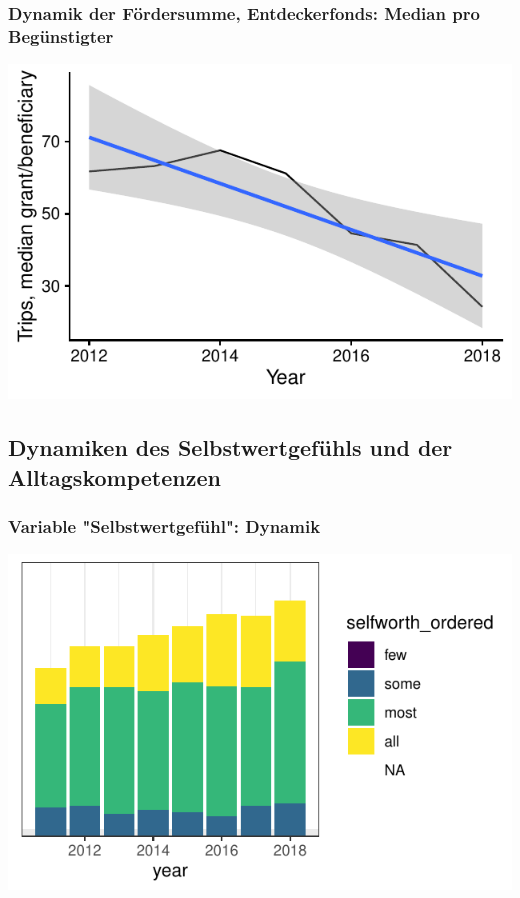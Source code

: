 \begin{frame}[fragile]
\frametitle{Dynamik der Fördersumme, Entdeckerfonds: Median pro Begünstigter}


{\centering \includegraphics[width=\maxwidth]{figure/beamer-FundamentalDynamicsTripsMedianPerBene-1} 

}



\end{frame}

\subsection{Dynamiken des Selbstwertgefühls und der Alltagskompetenzen}

\begin{frame}[fragile]
\frametitle{Variable "Selbstwertgefühl": Dynamik}
\begin{knitrout}\footnotesize
{}\color{fgcolor}

{\centering \includegraphics[width=\maxwidth]{figure/beamer-SelfworthTime-1} 

}



\end{knitrout}
\end{frame}


